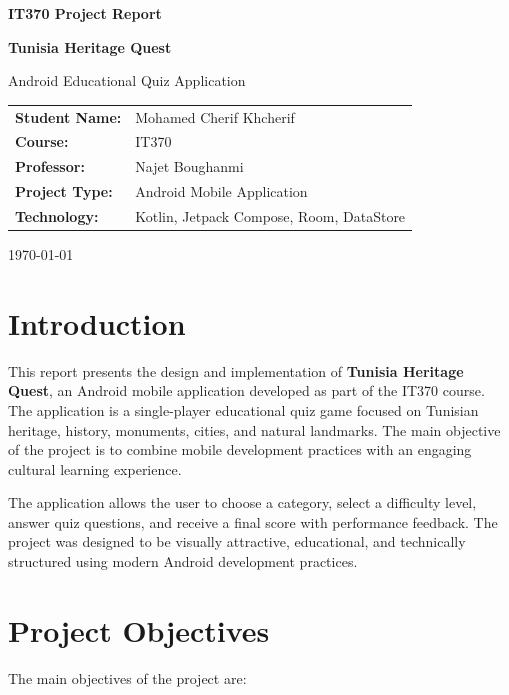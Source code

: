\documentclass[12pt,a4paper]{article}
\begin{document}
\begin{titlepage}
    \centering
    \vspace*{2cm}

    {\Large \textbf{IT370 Project Report}\par}
    \vspace{1cm}
    {\huge \textbf{Tunisia Heritage Quest}\par}
    \vspace{1.5cm}

    {\Large Android Educational Quiz Application\par}
    \vspace{2cm}

    \begin{tabular}{>{\bfseries}l l}
        Student Name: & Mohamed Cherif Khcherif \\
        Course: & IT370 \\
        Professor: & Najet Boughanmi \\
        Project Type: & Android Mobile Application \\
        Technology: & Kotlin, Jetpack Compose, Room, DataStore \\
    \end{tabular}

    \vfill
    {\large \today\par}
\end{titlepage}

\tableofcontents
\newpage

\section{Introduction}
This report presents the design and implementation of \textbf{Tunisia Heritage Quest}, an Android mobile application developed as part of the IT370 course. The application is a single-player educational quiz game focused on Tunisian heritage, history, monuments, cities, and natural landmarks. The main objective of the project is to combine mobile development practices with an engaging cultural learning experience.

The application allows the user to choose a category, select a difficulty level, answer quiz questions, and receive a final score with performance feedback. The project was designed to be visually attractive, educational, and technically structured using modern Android development practices.

\section{Project Objectives}
The main objectives of the project are:
\end{document}
